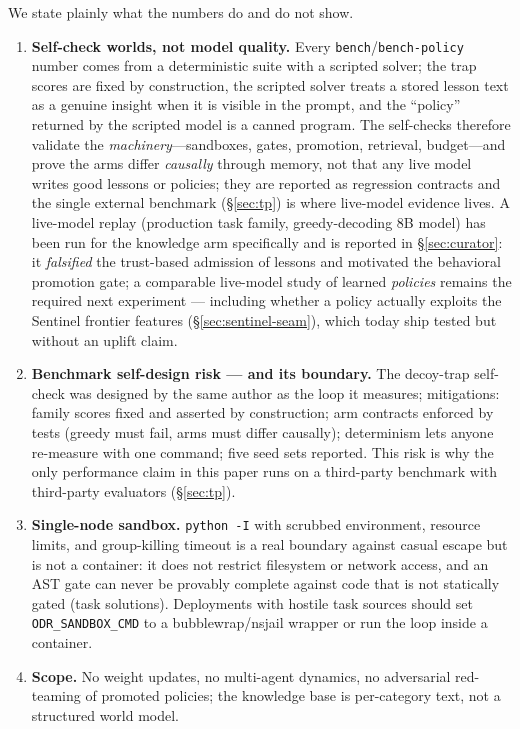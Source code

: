 \documentclass[11pt,a4paper]{article}
\newcommand{\hdr}[1]{\textbf{#1}}
\begin{document}
We state plainly what the numbers do and do not show.
\begin{enumerate}
  \item \hdr{Self-check worlds, not model quality.} Every
  \texttt{bench}/\texttt{bench-policy} number comes from a deterministic
  suite with a scripted solver; the trap scores are
  fixed by construction, the scripted solver treats a stored lesson text as a
  genuine insight when it is visible in the prompt, and the ``policy''
  returned by the scripted model is a canned program. The self-checks
  therefore validate the \emph{machinery}---sandboxes, gates, promotion,
  retrieval, budget---and prove the arms differ \emph{causally} through
  memory, not that any live model writes good lessons or policies; they are
  reported as regression contracts and the single external benchmark
  (\S\ref{sec:tp}) is where live-model evidence lives. A
  live-model replay (production task family, greedy-decoding 8B model) has
  been run for the knowledge arm specifically and is reported in
  \S\ref{sec:curator}: it \emph{falsified} the trust-based admission of
  lessons and motivated the behavioral promotion gate; a comparable
  live-model study of learned \emph{policies} remains the required next
  experiment --- including whether a policy actually exploits the Sentinel
  frontier features (\S\ref{sec:sentinel-seam}), which today ship tested
  but without an uplift claim.
  \item \hdr{Benchmark self-design risk --- and its boundary.} The
  decoy-trap self-check was designed by the same author as the loop it
  measures; mitigations: family scores fixed and asserted by construction;
  arm contracts enforced by tests (greedy must
  fail, arms must differ causally); determinism lets anyone re-measure with
  one command; five seed sets reported. This risk is why the only
  performance claim in this paper runs on a third-party benchmark with
  third-party evaluators (\S\ref{sec:tp}).
  \item \hdr{Single-node sandbox.} \texttt{python -I} with scrubbed environment,
  resource limits, and group-killing timeout is a real boundary against casual
  escape but is not a container: it does not restrict filesystem or network
  access, and an AST gate can never be provably complete against code that is
  not statically gated (task solutions). Deployments with hostile task sources
  should set \texttt{ODR\_SANDBOX\_CMD} to a bubblewrap/nsjail wrapper or run
  the loop inside a container.
  \item \hdr{Scope.} No weight updates, no multi-agent dynamics, no adversarial
  red-teaming of promoted policies; the knowledge base is per-category text,
  not a structured world model.
\end{enumerate}
\end{document}
